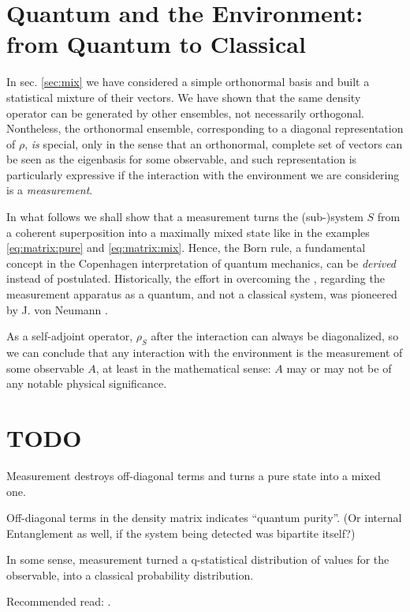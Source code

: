 \section{Quantum and the Environment: from Quantum to Classical}

In sec. \ref{sec:mix} we have considered a simple orthonormal basis
and built a statistical mixture of their vectors. We have shown
that the same density operator can be generated by other ensembles,
not necessarily orthogonal. Nontheless, the orthonormal ensemble,
corresponding to a diagonal representation of $\rho$, \emph{is}
special, only in the sense that an orthonormal, complete set of
vectors can be seen as the eigenbasis for some observable,
and such representation is particularly expressive if the
interaction with the environment we are considering is a 
\emph{measurement}.

In what follows we shall show that a measurement turns
the (sub-)system $S$ from a coherent superposition into a
maximally mixed state like in the examples
\eqref{eq:matrix:pure} and \eqref{eq:matrix:mix}.
Hence, the Born rule, a fundamental concept in the
Copenhagen interpretation of quantum mechanics, can be
\emph{derived} instead of postulated. Historically,
the effort in overcoming the ,
regarding the measurement apparatus as a quantum,
and not a classical system,
was pioneered by J. von Neumann \parencite{VonNeumann}.

As a self-adjoint operator, $\rho_S$ after the interaction
can always be diagonalized, so we can conclude that any
interaction with the environment is the measurement of some
observable $A$, at least in the mathematical sense: $A$ may or
may not be of any notable physical significance.

\section{TODO}

Measurement destroys off-diagonal terms and turns a pure state into a mixed one.

Off-diagonal terms in the density matrix indicates ``quantum purity''.
(Or internal Entanglement as well, if the system being detected was bipartite itself?)

In some sense, measurement turned a q-statistical distribution of values for the observable,
into a classical probability distribution.

Recommended read: \cite{Zurek_Decoherence, Zurek_Fundamentals}.

